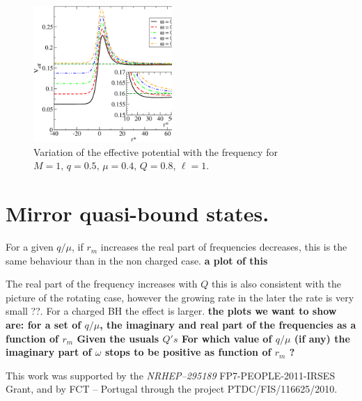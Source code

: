 \documentclass[aps, prd, twocolumn, amsmath, floats,floatfix, superscriptaddress,
nofootinbib, showpacs]{revtex4-1}
\begin{document}
\begin{figure}[!ht]
\includegraphics[width=0.47\textwidth]{m0.4_Q0.8_q0.5_ws.eps}
\caption{Variation of the effective potential with the frequency for $M=1,\,q=0.5,\,
\mu=0.4 ,\, Q=0.8$, $\ell=1$.}
\label{fig:pot_w}
\end{figure}

\section{Mirror quasi-bound states.}
\label{sec:Mbound-states}
For a given $q/\mu$, if $r_m$ increases the real part of frequencies decreases, this is
the same behaviour than in the non charged case.
{\bf a plot of this}

The real part of the frequency increases with $Q$ this is also consistent with the picture
of the rotating case, however the growing rate in the later the rate is very small ??. For
a charged BH the effect is larger. 
{\bf the plots we want to show are:
for a set of $q/\mu$, the imaginary and real part of the frequencies as a function of
$r_{m}$
Given the usuals $Q's$ 
For which value of $q/\mu$ (if any) the imaginary part of $\omega$ stops to be positive
as function of $r_{m}$ ?
}



  This work was supported by the {\it NRHEP--295189} FP7-PEOPLE-2011-IRSES Grant, and by
  FCT -- Portugal through the project PTDC/FIS/116625/2010.







\end{document}
